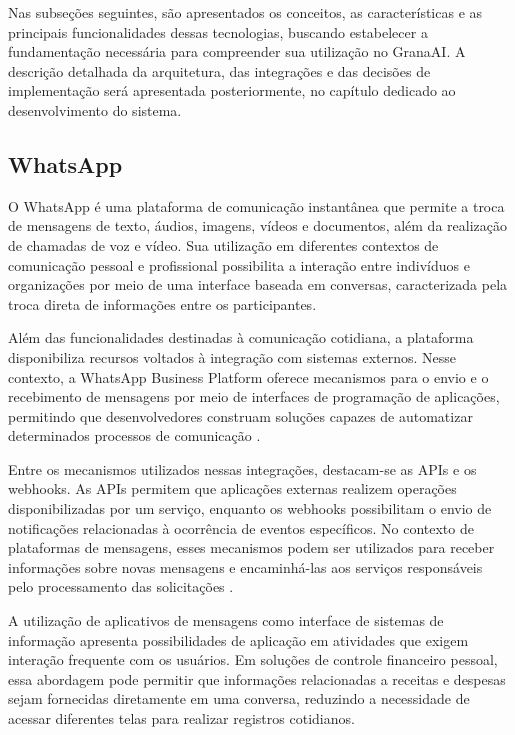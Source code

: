 Nas subseções seguintes, são apresentados os conceitos, as características e as principais funcionalidades dessas tecnologias, buscando estabelecer a fundamentação necessária para compreender sua utilização no GranaAI. A descrição detalhada da arquitetura, das integrações e das decisões de implementação será apresentada posteriormente, no capítulo dedicado ao desenvolvimento do sistema.

\subsection{WhatsApp}

O WhatsApp é uma plataforma de comunicação instantânea que permite a troca de mensagens de texto, áudios, imagens, vídeos e documentos, além da realização de chamadas de voz e vídeo. Sua utilização em diferentes contextos de comunicação pessoal e profissional possibilita a interação entre indivíduos e organizações por meio de uma interface baseada em conversas, caracterizada pela troca direta de informações entre os participantes.

Além das funcionalidades destinadas à comunicação cotidiana, a plataforma disponibiliza recursos voltados à integração com sistemas externos. Nesse contexto, a WhatsApp Business Platform oferece mecanismos para o envio e o recebimento de mensagens por meio de interfaces de programação de aplicações, permitindo que desenvolvedores construam soluções capazes de automatizar determinados processos de comunicação \cite{whatsapp_cloud_api_2026}.

Entre os mecanismos utilizados nessas integrações, destacam-se as APIs e os webhooks. As APIs permitem que aplicações externas realizem operações disponibilizadas por um serviço, enquanto os webhooks possibilitam o envio de notificações relacionadas à ocorrência de eventos específicos. No contexto de plataformas de mensagens, esses mecanismos podem ser utilizados para receber informações sobre novas mensagens e encaminhá-las aos serviços responsáveis pelo processamento das solicitações \cite{whatsapp_cloud_api_2026}.

A utilização de aplicativos de mensagens como interface de sistemas de informação apresenta possibilidades de aplicação em atividades que exigem interação frequente com os usuários. Em soluções de controle financeiro pessoal, essa abordagem pode permitir que informações relacionadas a receitas e despesas sejam fornecidas diretamente em uma conversa, reduzindo a necessidade de acessar diferentes telas para realizar registros cotidianos.

